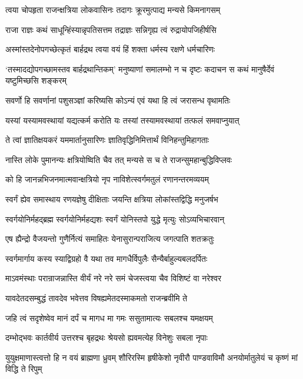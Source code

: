 \twolineshloka
{त्वया चोपहृता राजन्क्षत्रिया लोकवासिनः}
{तदागः क्रूरमुत्पाद्य मन्यसे किमनागसम्}


\twolineshloka
{राजा राज्ञः कथं साधून्हिंस्यान्नृपतिसत्तम}
{तद्राज्ञः सन्निगृह्य त्वं रुद्रायोपजिहीर्षसि}


\twolineshloka
{अस्मांस्तदेनोपगच्छेत्कृतं बार्हद्रथ त्वया}
{वयं हिं शक्ता धर्मस्य रक्षणे धर्मचारिणः}


\threelineshloka
{`तस्मादद्योपगच्छामस्तव बार्हद्रथान्तिकम्'}
{मनुष्याणां समालम्भो न च दृष्टः कदाचन}
{स कथं मानुषैर्देवं यष्टुमिच्छसि शङ्करम्}


\twolineshloka
{सवर्णो हि सवर्णानां पशुसञ्ज्ञां करिष्यसि}
{कोऽन्यं एवं यथा हि त्वं जरासन्ध वृथामतिः}


\twolineshloka
{यस्यां यस्यामवस्थायां यद्यत्कर्म करोति यः}
{तस्यां तस्यामवस्थायां तत्फलं समवाप्नुयात्}


\twolineshloka
{ते त्वां ज्ञातिक्षयकरं यममार्तानुसारिणः}
{ज्ञातिवृद्धिनिमित्तार्थं विनिहन्तुमिहागताः}


\twolineshloka
{नास्ति लोके पुमानन्यः क्षत्रियोष्विति चैव तत्}
{मन्यसे स च ते राजन्सुमहान्बुद्धिविप्लवः}


\twolineshloka
{को हि जानन्नभिजनमात्मवान्क्षत्रियो नृप}
{नाविशेत्स्वर्गमतुलं रणानन्तरमव्ययम्}


\twolineshloka
{स्वर्गं ह्येव समास्थाय रणयज्ञेषु दीक्षिताः}
{जयन्ति क्षत्रिया लोकांस्तद्विद्धि मनुजर्षभ}


\twolineshloka
{स्वर्गयोनिर्महद्ब्रह्म स्वर्गयोनिर्महद्यशः}
{स्वर्गं योनिस्तपो युद्धे मृत्युः सोऽव्यभिचारवान्}


\twolineshloka
{एष ह्यैन्द्रो वैजयन्तो गुणैर्नित्यं समाहितः}
{येनासुरान्पराजित्य जगत्पाति शतक्रतुः}


\twolineshloka
{स्वर्गमार्गाय कस्य स्याद्विग्रहो वै यथा तव}
{मागधैर्विपुलैः सैन्यैर्बाहुल्यबलदर्पितः}


\twolineshloka
{माऽवमंस्थाः परान्राजन्नास्ति वीर्यं नरे नरे}
{समं चेजस्त्वया चैव विशिष्टं वा नरेश्वर}


\twolineshloka
{यावदेतदसम्बुद्धं तावदेव भवेत्तव}
{विषह्यमेतदस्माकमतो राजन्ब्रवीमि ते}


\twolineshloka
{जहि त्वं सदृशेष्वेव मानं दर्पं च मागध}
{मा गमः ससुतामात्यः सबलश्च यमक्षयम्}


\twolineshloka
{दम्भोद्भवः कार्तवीर्य उत्तरश्च बृहद्रथः}
{श्रेयसो ह्यवमत्येह विनेशुः सबला नृपाः}


\threelineshloka
{युयुक्षमाणास्त्वत्तो हि न वयं ब्राह्मणा ध्रुवम्}
{शौरिरस्मि हृषीकेशो नृवीरौ पाण्डवाविमौ}
{अनयोर्मातुलेयं च कृष्णं मां विद्धि ते रिपुम्}


